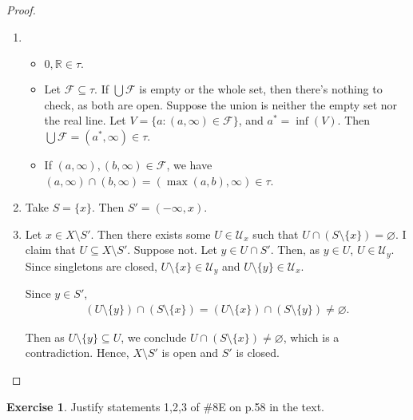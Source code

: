 \documentclass[12pt]{extarticle}
\newcommand{\set}[1]{\{#1\}}
\newcommand{\R}{\mathbb{R}}
\newcommand{\<}{\langle}
\renewcommand{\>}{\rangle}
\renewcommand{\emptyset}{\varnothing}
\theoremstyle{definition}
\newtheorem{exercise}{Exercise}
\begin{document}
\begin{proof}
  \begin{enumerate}
  \item
    \begin{itemize}
    \item
      $ 0, \R \in \tau.$
    \item
      Let $\mathcal{F} \subseteq \tau$. If $\bigcup \mathcal{F}$ is empty or the whole set, then there's nothing to check, as both are open. Suppose the union is neither the empty set nor the real line. Let $V = \set{a: (a, \infty) \in \mathcal{F}}$, and $a^* = \inf(V)$. Then $\bigcup \mathcal{F} = (a^*, \infty) \in \tau$. 
    \item
      If $(a, \infty), (b, \infty) \in \mathcal{F}$, we have $(a, \infty) \cap (b, \infty) = (\max(a,b), \infty) \in \tau$.
    \end{itemize}
  \item
    Take $S = \set{x}$. Then $S' = (-\infty, x)$. 
  \item
    Let $x \in X \setminus S'$. Then there exists some $U \in \mathcal{U}_x$ such that $U \cap (S \setminus \set{x}) = \emptyset$. I claim that $U \subseteq X \setminus S'$. Suppose not. Let $y \in U \cap S'$. Then, as $y \in U$, $U \in \mathcal{U}_y$. Since singletons are closed, $U \setminus \set{x} \in \mathcal{U}_y$ and $U \setminus \set{y} \in \mathcal{U}_x$.
    
    Since $y \in S'$,
    \begin{align*}
      (U \setminus \set{y}) \cap (S \setminus \set{x}) = (U \setminus \set{x}) \cap (S \setminus \set{y}) \neq \emptyset.
    \end{align*}

    Then as $U \setminus \set{y} \subseteq U$, we conclude $U \cap (S \setminus \set{x}) \neq \emptyset$, which is a contradiction. Hence, $X \setminus S'$ is open and $S'$ is closed. 

  \end{enumerate}
\end{proof}
\begin{exercise}
  Justify statements 1,2,3 of \#8E on p.58 in the text.
\end{exercise}
\end{document}
